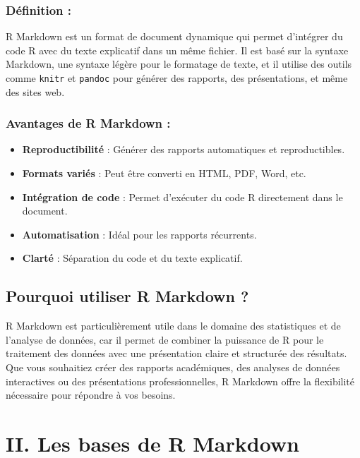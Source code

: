 \documentclass[
]{article}
\providecommand{\tightlist}{%
  \setlength{\itemsep}{0pt}\setlength{\parskip}{0pt}}
\begin{document}
\hypertarget{duxe9finition}{%
\subsubsection{Définition :}\label{duxe9finition}}

R Markdown est un format de document dynamique qui permet d'intégrer du
code R avec du texte explicatif dans un même fichier. Il est basé sur la
syntaxe Markdown, une syntaxe légère pour le formatage de texte, et il
utilise des outils comme \texttt{knitr} et \texttt{pandoc} pour générer
des rapports, des présentations, et même des sites web.

\hypertarget{avantages-de-r-markdown}{%
\subsubsection{Avantages de R Markdown
:}\label{avantages-de-r-markdown}}

\begin{itemize}
\tightlist
\item
  \textbf{Reproductibilité} : Générer des rapports automatiques et
  reproductibles.
\item
  \textbf{Formats variés} : Peut être converti en HTML, PDF, Word, etc.
\item
  \textbf{Intégration de code} : Permet d'exécuter du code R directement
  dans le document.
\item
  \textbf{Automatisation} : Idéal pour les rapports récurrents.
\item
  \textbf{Clarté} : Séparation du code et du texte explicatif.
\end{itemize}

\hypertarget{pourquoi-utiliser-r-markdown}{%
\subsection{Pourquoi utiliser R Markdown
?}\label{pourquoi-utiliser-r-markdown}}

R Markdown est particulièrement utile dans le domaine des statistiques
et de l'analyse de données, car il permet de combiner la puissance de R
pour le traitement des données avec une présentation claire et
structurée des résultats. Que vous souhaitiez créer des rapports
académiques, des analyses de données interactives ou des présentations
professionnelles, R Markdown offre la flexibilité nécessaire pour
répondre à vos besoins.

\hypertarget{ii.-les-bases-de-r-markdown}{%
\section{II. Les bases de R
Markdown}\label{ii.-les-bases-de-r-markdown}}
\end{document}
